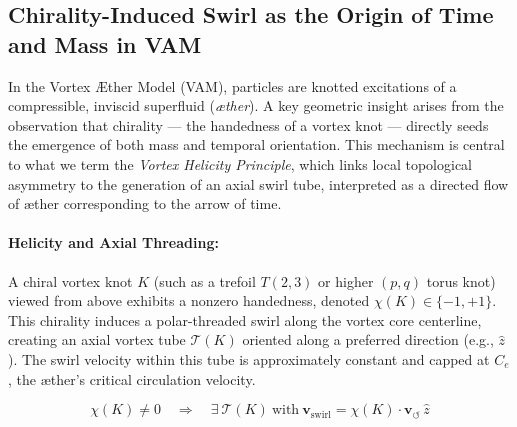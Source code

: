 \subsection{Chirality-Induced Swirl as the Origin of Time and Mass in VAM}

In the Vortex Æther Model (VAM), particles are knotted excitations of a compressible, inviscid superfluid (\emph{æther}). A key geometric insight arises from the observation that chirality --- the handedness of a vortex knot --- directly seeds the emergence of both mass and temporal orientation. This mechanism is central to what we term the \emph{Vortex Helicity Principle}, which links local topological asymmetry to the generation of an axial swirl tube, interpreted as a directed flow of æther corresponding to the arrow of time.

\paragraph{Helicity and Axial Threading:}
A chiral vortex knot $K$ (such as a trefoil $T(2,3)$ or higher $(p,q)$ torus knot) viewed from above exhibits a nonzero handedness, denoted $\chi(K) \in \{-1, +1\}$. This chirality induces a polar-threaded swirl along the vortex core centerline, creating an axial vortex tube $\mathcal{T}(K)$ oriented along a preferred direction (e.g., $\hat{z}$). The swirl velocity within this tube is approximately constant and capped at $C_e$, the æther’s critical circulation velocity.

\begin{equation}
    \chi(K) \neq 0 \quad \Rightarrow \quad \exists~\mathcal{T}(K)~\text{with}~\mathbf{v}_{\text{swirl}} = \chi(K) \cdot \mathbf{v}_{\scriptscriptstyle\boldsymbol{\circlearrowleft}} \, \hat{z}
\end{equation}

